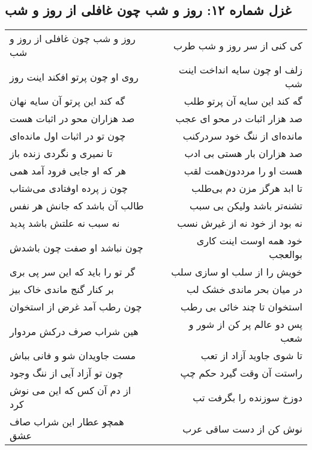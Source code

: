 \begin{center}
\section*{غزل شماره ۱۲: روز و شب چون غافلی از روز و شب}
\label{sec:012}
\begin{longtable}{l p{0.5cm} r}
روز و شب چون غافلی از روز و شب
&&
کی کنی از سر روز و شب طرب
\\
روی او چون پرتو افکند اینت روز
&&
زلف او چون سایه انداخت اینت شب
\\
گه کند این پرتو آن سایه نهان
&&
گه کند این سایه آن پرتو طلب
\\
صد هزاران محو در اثبات هست
&&
صد هزار اثبات در محو ای عجب
\\
چون تو در اثبات اول مانده‌ای
&&
مانده‌ای از ننگ خود سردرکنب
\\
تا نمیری و نگردی زنده باز
&&
صد هزاران بار هستی بی ادب
\\
هر که او جایی فرود آمد همی
&&
هست او را مرددون‌همت لقب
\\
چون ز پرده اوفتادی می‌شتاب
&&
تا ابد هرگز مزن دم بی‌طلب
\\
طالب آن باشد که جانش هر نفس
&&
تشنه‌تر باشد ولیکن بی سبب
\\
نه سبب نه علتش باشد پدید
&&
نه بود از خود نه از غیرش نسب
\\
چون نباشد او صفت چون باشدش
&&
خود همه اوست اینت کاری بوالعجب
\\
گر تو را باید که این سر پی بری
&&
خویش را از سلب او سازی سلب
\\
بر کنار گنج ماندی خاک بیز
&&
در میان بحر ماندی خشک لب
\\
چون رطب آمد غرض از استخوان
&&
استخوان تا چند خائی بی رطب
\\
هین شراب صرف درکش مردوار
&&
پس دو عالم پر کن از شور و شعب
\\
مست جاویدان شو و فانی بباش
&&
تا شوی جاوید آزاد از تعب
\\
چون تو آزاد آیی از ننگ وجود
&&
راستت آن وقت گیرد حکم چپ
\\
از دم آن کس که این می نوش کرد
&&
دوزخ سوزنده را بگرفت تب
\\
همچو عطار این شراب صاف عشق
&&
نوش کن از دست ساقی عرب
\\
\end{longtable}
\end{center}
